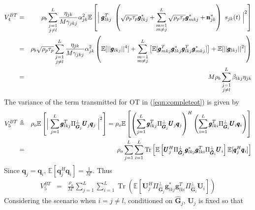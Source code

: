 \documentclass[10pt, a4paper, twoside,fleqn]{article}
\DeclareMathOperator{\Tr}{Tr}
\begin{document}
\begin{eqnarray}
V_4^{BT} &=& \rho_b\sum_{\substack{j=1 \\ j \neq l}}^{L}\frac{\eta_{jk}}{M\gamma_{jkj}}\alpha_{jk}^2\mathbb{E}\left[\Bigm| \pmb{g}_{lkj}^T \ \left(\sqrt{\rho_p\tau_p}\pmb{g}^*_{lkj}
                          			 +\sum_{\substack{m=1 \\ m \neq j}}^{L} \sqrt{\rho_p\tau_p}\pmb{g}^*_{mkj}
             			   			 +\pmb{n}^*_{jk}\right) 
             			   	\ s_{jk} (t)\Bigm|^2\right] \nonumber \\
         &=& \rho_b\sqrt{\rho_p\tau_p}\sum_{\substack{j=1 \\ j \neq l}}^{L}\frac{\eta_{jk}}{M\gamma_{jkj}}\alpha_{jk}^2\left(\mathbb{E}[||\pmb{g}_{lkj}||^4] + \sum\limits_{\substack{m=1 \\ m\neq j}}^{L}\left[\mathbb{E}[\pmb{g}^T_{mkj}\pmb{g}^*_{lkj}\pmb{g}^T_{lkj}\pmb{g}^*_{mkj}]\right]+\mathbb{E}[||\pmb{g}_{lkj}||^2]\right) \nonumber \\
    &=& M\rho_b\sum\limits_{\substack{j=1 \\ j \neq l}}^{L}\beta_{lkj}\eta_{jk}
\end{eqnarray}
The variance of the term transmitted for OT in (\ref{eqn:completeot}) is given by
\begin{eqnarray}
	V_5^{BT} &\triangleq& \rho_o\mathbb{E}\left[\Bigm|\sum_{j=1}^{L}\pmb{g}_{lkj}^T\Pi^{\perp}_{{\hat{\pmb{G}}_j}}\pmb{U}_j \pmb{q}_{j}\Bigm|^2\right] = \rho_o\mathbb{E}\left[\left(\sum_{j=1}^{L}\pmb{g}_{lkj}^T\Pi^{\perp}_{{\hat{\pmb{G}}_j}}\pmb{U}_j \pmb{q}_{j}\right)^H\left(\sum_{i=1}^{L}\pmb{g}_{lki}^T\Pi^{\perp}_{{\hat{\pmb{G}}_i}}\pmb{U}_i \pmb{q}_{i}\right)\right]  \nonumber \\
	        &=& \rho_o\sum\limits_{j=1}^{L}\sum\limits_{i=1}^{L}\Tr\left[\mathbb{E}\left[\pmb{U}_j^H \Pi^{\perp}_{\pmb{\hat{G}}_j} \pmb{g}_{lkj}^* \pmb{g}_{lki}^{T}\Pi^{\perp}_{\pmb{\hat G}_i} \pmb{U}_i\right]\mathbb{E}[\pmb{q}_j^H\pmb{q}_i]\right]
\end{eqnarray}
Since $\pmb{q}_j=\pmb{q}_i$, $\mathbb{E}[\pmb{q}_j^H\pmb{q}_i]=\frac{1}{M'}$. Thus
\begin{eqnarray}\label{eqn:noiseF4_1}	    
           V_5^{BT} &=&       \frac{\rho_o}{M'}\sum_{j=1}^{L}\sum_{i=1}^{L} \Tr\left(\mathbb{E}\left[\pmb{U}_j^H \Pi^{\perp}_{\pmb{\hat{G}}_j} \pmb{g}_{lkj}^* \pmb{g}_{lki}^{T}\Pi^{\perp}_{\pmb{\hat G}_i} \pmb{U}_i\right]\right)
\end{eqnarray}
Considering the scenario when $i=j\neq l$, conditioned on $\pmb{\hat G}_j$, $\pmb{U}_j$ is fixed so that
\end{document}
